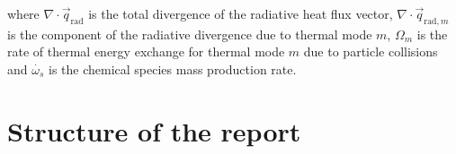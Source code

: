\noindent where $\nabla \cdot \vec{q}_\text{rad}$ is the total divergence of the radiative heat flux vector, $\nabla \cdot \vec{q}_{\text{rad},m}$ is the component of the radiative divergence due to thermal mode $m$, $\Omega_m$ is the rate of thermal energy exchange for thermal mode $m$ due to particle collisions and $\dot{\omega_{s}}$ is the chemical species mass production rate.

\section{Structure of the report}












